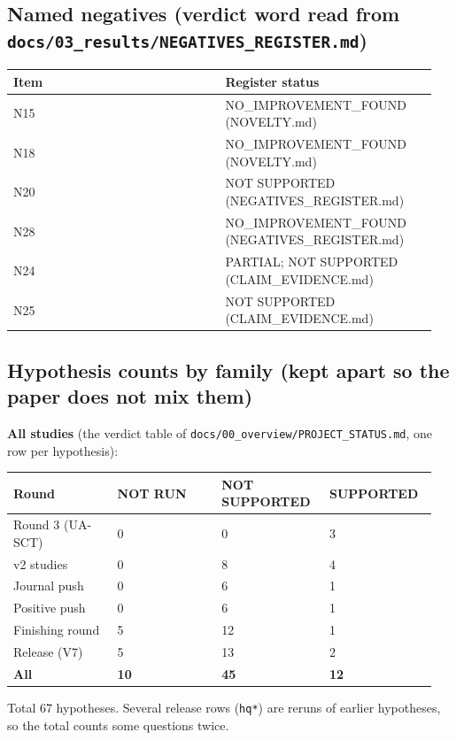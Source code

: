 \subsection*{Named negatives (verdict word read from \texttt{docs/03\_results/NEGATIVES\_REGISTER.md})}

{\scriptsize\raggedright
\begin{longtable}{p{0.475\linewidth}p{0.475\linewidth}}
\toprule
Item & Register status \\
\midrule
\endhead
N15 & NO\_IMPROVEMENT\_FOUND (NOVELTY.md) \\
N18 & NO\_IMPROVEMENT\_FOUND (NOVELTY.md) \\
N20 & NOT SUPPORTED (NEGATIVES\_REGISTER.md) \\
N28 & NO\_IMPROVEMENT\_FOUND (NEGATIVES\_REGISTER.md) \\
N24 & PARTIAL; NOT SUPPORTED (CLAIM\_EVIDENCE.md) \\
N25 & NOT SUPPORTED (CLAIM\_EVIDENCE.md) \\
\bottomrule
\end{longtable}}

\subsection*{Hypothesis counts by family (kept apart so the paper does not mix them)}

\textbf{All studies} (the verdict table of \texttt{docs/00\_overview/PROJECT\_STATUS.md}, one row per hypothesis):

{\scriptsize\raggedright
\begin{longtable}{p{0.237\linewidth}p{0.237\linewidth}p{0.237\linewidth}p{0.237\linewidth}}
\toprule
Round & NOT RUN & NOT SUPPORTED & SUPPORTED \\
\midrule
\endhead
Round 3 (UA-SCT) & 0 & 0 & 3 \\
v2 studies & 0 & 8 & 4 \\
Journal push & 0 & 6 & 1 \\
Positive push & 0 & 6 & 1 \\
Finishing round & 5 & 12 & 1 \\
Release (V7) & 5 & 13 & 2 \\
\textbf{All} & \textbf{10} & \textbf{45} & \textbf{12} \\
\bottomrule
\end{longtable}}

Total 67 hypotheses. Several release rows (\texttt{hq*}) are reruns of earlier hypotheses, so the total counts some questions twice.

